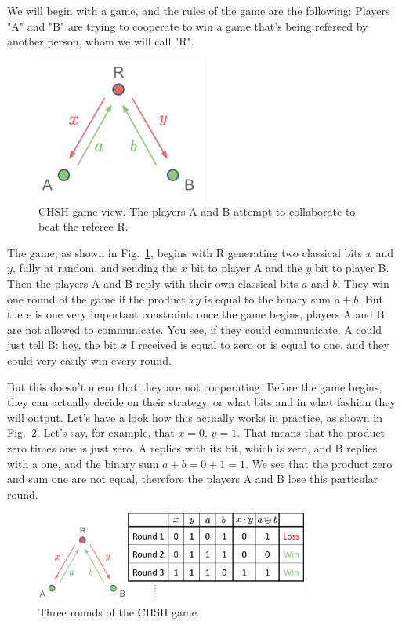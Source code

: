 
We will begin with a game, and the rules of the game are the following: Players "A" and "B" are trying to cooperate to win a game that's being refereed by another person, whom we will call "R".

\begin{figure}[H]
    \centering
    \includegraphics[width=0.5\textwidth]{lesson4/CHSH_diagram.pdf}
        \caption[CHSH game view]{CHSH game view. The players A and B attempt to collaborate to beat the referee R.}
    \label{fig:chsh-game}
\end{figure}

The game, as shown in Fig.~\ref{fig:chsh-game}, begins with R generating two classical bits $x$ and $y$, fully at random, and sending the $x$ bit to player A and the $y$ bit to player B. Then the players A and B reply with their own classical bits $a$ and $b$. They win one round of the game if the product $xy$ is equal to the binary sum $a + b$. But there is one very important constraint: once the game begins, players A and B are not allowed to communicate. You see, if they could communicate, A could just tell B: hey, the bit $x$ I received is equal to zero or is equal to one, and they could very easily win every round.

But this doesn't mean that they are not cooperating. Before the game begins, they can actually decide on their strategy, or what bits and in what fashion they will output. Let's have a look how this actually works in practice, as shown in Fig.~\ref{fig:chsh-game-rounds}. Let's say, for example, that $x =0$, $y = 1$. That means that the product zero times one is just zero. A replies with its bit, which is zero, and B replies with a one, and the binary sum $a + b = 0 + 1 = 1$. We see that the product zero and sum one are not equal, therefore the players A and B lose this particular round.
\begin{figure}[H]
    \centering
    \includegraphics[width=0.8\textwidth]{lesson4/CHSH_rounds.pdf}
        \caption{Three rounds of the CHSH game.}
    \label{fig:chsh-game-rounds}
\end{figure}

